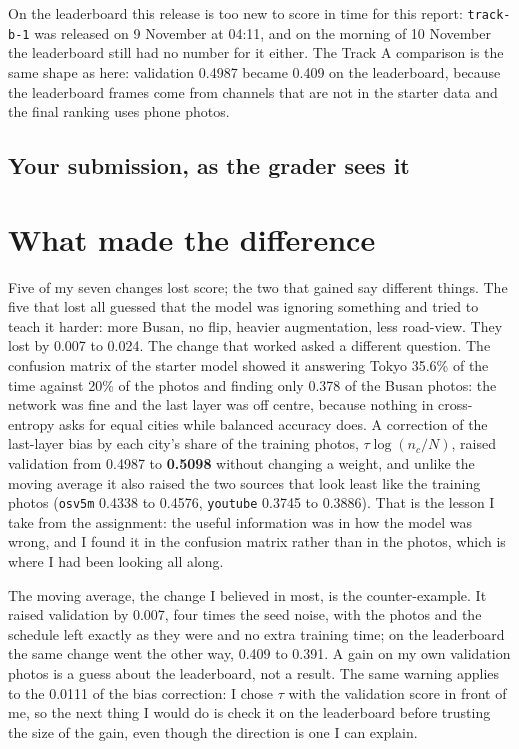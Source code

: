 \documentclass[11pt]{article}
\begin{document}
On the leaderboard this release is too new to score in time for this report:
\texttt{track-b-1} was released on 9 November at 04:11, and on the morning of
10 November the leaderboard still had no number for it either. The Track A comparison is
the same shape as here: validation 0.4987 became 0.409 on the leaderboard,
because the leaderboard frames come from channels that are not in the starter
data and the final ranking uses phone photos.

\subsection*{Your submission, as the grader sees it}

\section*{What made the difference}

Five of my seven changes lost score; the two that gained say different things.
The five that lost all guessed that the model was ignoring something and tried
to teach it harder: more Busan, no flip, heavier augmentation, less road-view.
They lost by 0.007 to 0.024. The change that worked asked a different
question. The confusion matrix of the starter model showed it answering Tokyo
35.6\% of the time against 20\% of the photos and finding only 0.378 of the
Busan photos: the network was fine and the last layer was off centre, because
nothing in cross-entropy asks for equal cities while balanced accuracy does. A
correction of the last-layer bias by each city's share of the training photos,
$\tau \log(n_c/N)$, raised validation from
0.4987 to \textbf{0.5098} without changing a weight, and unlike the moving
average it also raised the two sources that look least like the training photos
(\texttt{osv5m} 0.4338 to 0.4576, \texttt{youtube} 0.3745 to 0.3886). That is
the lesson I take from the assignment: the useful information was in how the
model was wrong, and I found it in the confusion matrix rather than in the
photos, which is where I had been looking all along.

The moving average, the change I believed in most, is the counter-example.
It raised validation by 0.007, four times the seed noise, with the photos and
the schedule left exactly as they were and no extra training time; on the
leaderboard the same change went the other way, 0.409 to 0.391. A gain on my own
validation photos is a guess about the leaderboard, not a result. The same
warning applies to the 0.0111 of the bias correction: I chose $\tau$ with the
validation score in front of me, so the next thing I would do is check it on the
leaderboard before trusting the size of the gain, even though the direction is
one I can explain.
\end{document}
